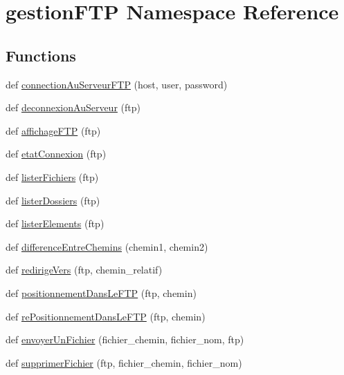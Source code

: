 \hypertarget{namespacegestion_f_t_p}{}\section{gestion\+F\+TP Namespace Reference}
\label{namespacegestion_f_t_p}
\subsection*{Functions}
\begin{DoxyCompactItemize}
\item 
def \hyperlink{namespacegestion_f_t_p_ac302a85ee832b8ee7df6332236fb03fd}{connection\+Au\+Serveur\+F\+TP} (host, user, password)
\item 
def \hyperlink{namespacegestion_f_t_p_a9af85f209eb48e2ab12361a74c23357d}{deconnexion\+Au\+Serveur} (ftp)
\item 
def \hyperlink{namespacegestion_f_t_p_af55225f5cdcb61a67ac02eeebf5f3860}{affichage\+F\+TP} (ftp)
\item 
def \hyperlink{namespacegestion_f_t_p_a18440a52ad61b01732d15fcbd809f0d6}{etat\+Connexion} (ftp)
\item 
def \hyperlink{namespacegestion_f_t_p_a8ea306f854213c2d395b2ee10d648309}{lister\+Fichiers} (ftp)
\item 
def \hyperlink{namespacegestion_f_t_p_a2f67d833c10d35ec09aab3185d4b92f3}{lister\+Dossiers} (ftp)
\item 
def \hyperlink{namespacegestion_f_t_p_a137686a569213bca2d098b55ca5bb22e}{lister\+Elements} (ftp)
\item 
def \hyperlink{namespacegestion_f_t_p_a7024bab68d4f68d16ea5180b7054fa22}{difference\+Entre\+Chemins} (chemin1, chemin2)
\item 
def \hyperlink{namespacegestion_f_t_p_ae007d8a9b886240c557295c74a73ffa0}{redirige\+Vers} (ftp, chemin\+\_\+relatif)
\item 
def \hyperlink{namespacegestion_f_t_p_a34bbbfb02bc44375b8d262b9e011b802}{positionnement\+Dans\+Le\+F\+TP} (ftp, chemin)
\item 
def \hyperlink{namespacegestion_f_t_p_a7f82e0f663073c6be5a4107e13d65b89}{re\+Positionnement\+Dans\+Le\+F\+TP} (ftp, chemin)
\item 
def \hyperlink{namespacegestion_f_t_p_ae9eaad537c75d8beb4d50100f6b7eb53}{envoyer\+Un\+Fichier} (fichier\+\_\+chemin, fichier\+\_\+nom, ftp)
\item 
def \hyperlink{namespacegestion_f_t_p_a9ed81ad37ebdebc0cdf8fe7d902ea3d6}{supprimer\+Fichier} (ftp, fichier\+\_\+chemin, fichier\+\_\+nom)

\end{DoxyCompactItemize}
